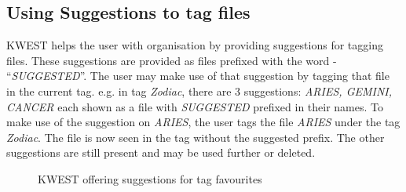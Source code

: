 \subsection{Using Suggestions to tag files}
KWEST helps the user with organisation by providing suggestions for tagging files. These suggestions are provided as files prefixed with the word - ``\textit{SUGGESTED}''. The user may make use of that suggestion by tagging that file in the current tag. \newline
e.g. in tag \textit{Zodiac}, there are 3 suggestions: \textit{ARIES, GEMINI, CANCER} each shown as a file with \textit{SUGGESTED} prefixed in their names. To make use of the suggestion on \textit{ARIES}, the user tags the file \textit{ARIES} under the tag \textit{Zodiac}. The file is now seen in the tag without the suggested prefix. The other suggestions are still present and may be used further or deleted.
\begin{figure}[htb]
\centering
\setlength\fboxsep{0pt}
\setlength\fboxrule{0.5pt}
\caption{KWEST offering suggestions for tag favourites}
\label{fig:dfd0}
\end{figure}
